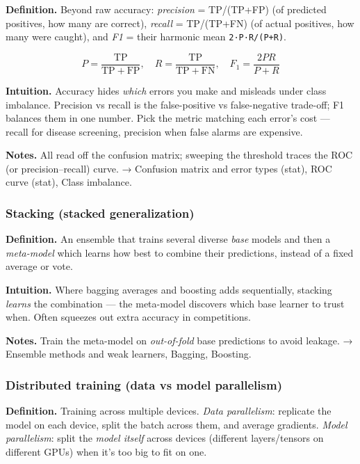 \documentclass[
  10pt,
  letterpaper,
  onecolumn]{article}
\begin{document}
\textbf{Definition.} Beyond raw accuracy: \emph{precision} = TP/(TP+FP)
(of predicted positives, how many are correct), \emph{recall} =
TP/(TP+FN) (of actual positives, how many were caught), and \emph{F1} =
their harmonic mean \texttt{2·P·R/(P+R)}.

\begin{equation*}
P=\frac{\mathrm{TP}}{\mathrm{TP}+\mathrm{FP}},\quad
R=\frac{\mathrm{TP}}{\mathrm{TP}+\mathrm{FN}},\quad
F_1=\frac{2PR}{P+R}
\end{equation*}

\textbf{Intuition.} Accuracy hides \emph{which} errors you make and
misleads under class imbalance. Precision vs recall is the
false-positive vs false-negative trade-off; F1 balances them in one
number. Pick the metric matching each error's cost --- recall for
disease screening, precision when false alarms are expensive.

\textbf{Notes.} All read off the confusion matrix; sweeping the
threshold traces the ROC (or precision--recall) curve. → Confusion
matrix and error types (stat), ROC curve (stat), Class imbalance.

\hypertarget{stacking-stacked-generalization}{%
\subsubsection{Stacking (stacked
generalization)}\label{stacking-stacked-generalization}}

\textbf{Definition.} An ensemble that trains several diverse \emph{base}
models and then a \emph{meta-model} which learns how best to combine
their predictions, instead of a fixed average or vote.

\textbf{Intuition.} Where bagging averages and boosting adds
sequentially, stacking \emph{learns} the combination --- the meta-model
discovers which base learner to trust when. Often squeezes out extra
accuracy in competitions.

\textbf{Notes.} Train the meta-model on \emph{out-of-fold} base
predictions to avoid leakage. → Ensemble methods and weak learners,
Bagging, Boosting.

\hypertarget{distributed-training-data-vs-model-parallelism}{%
\subsubsection{Distributed training (data vs model
parallelism)}\label{distributed-training-data-vs-model-parallelism}}

\textbf{Definition.} Training across multiple devices. \emph{Data
parallelism}: replicate the model on each device, split the batch across
them, and average gradients. \emph{Model parallelism}: split the
\emph{model itself} across devices (different layers/tensors on
different GPUs) when it's too big to fit on one.
\end{document}
